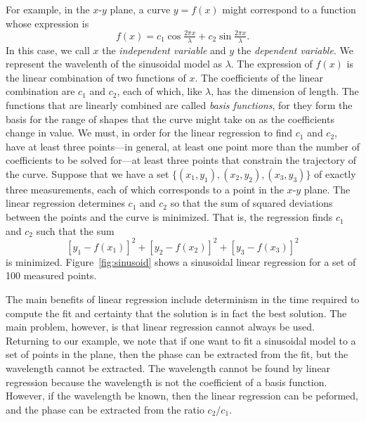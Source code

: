 \documentclass[twocolumn]{article}
\begin{document}
For example, in the $x$-$y$ plane, a curve $y = f(x)$ might correspond to a
function whose expression is
\begin{equation}
   f(x) = c_1 \cos\tfrac{2\pi x}{\lambda} + c_2 \sin\tfrac{2\pi x}{\lambda}.
\end{equation}
In this case, we call $x$ the \emph{independent variable} and $y$ the
\emph{dependent variable}.  We represent the wavelenth of the sinusoidal model
as $\lambda$.  The expression of $f(x)$ is the linear combination of two
functions of $x$. The coefficients of the linear combination are $c_1$ and
$c_2$, each of which, like $\lambda$, has the dimension of length. The
functions that are linearly combined are called \emph{basis functions}, for
they form the basis for the range of shapes that the curve might take on as the
coefficients change in value.  We must, in order for the linear regression to
find $c_1$ and $c_2$, have at least three points---in general, at least one
point more than the number of coefficients to be solved for---at least three
points that constrain the trajectory of the curve.  Suppose that we have a set
$\{(x_1, y_1), (x_2, y_2), (x_3, y_3)\}$ of exactly three measurements, each of
which corresponds to a point in the $x$-$y$ plane.  The linear regression
determines $c_1$ and $c_2$ so that the sum of squared deviations between the
points and the curve is minimized.  That is, the regression finds $c_1$ and
$c_2$ such that the sum
\begin{equation}
   \left[y_1 - f(x_1)\right]^2 + \left[y_2 - f(x_2)\right]^2 + \left[y_3 -
   f(x_3)\right]^2
\end{equation}
is minimized. Figure~\ref{fig:sinusoid} shows a sinusoidal linear regression
for a set of 100 measured points.

The main benefits of linear regression include determinism in the time required
to compute the fit and certainty that the solution is in fact the best
solution. The main problem, however, is that linear regression cannot always be
used.  Returning to our example, we note that if one want to fit a sinusoidal
model to a set of points in the plane, then the phase can be extracted from the
fit, but the wavelength cannot be extracted. The wavelength cannot be found by
linear regression because the wavelength is not the coefficient of a basis
function.  However, if the wavelength be known, then the linear regression can
be peformed, and the phase can be extracted from the ratio $c_2/c_1$.
\end{document}
